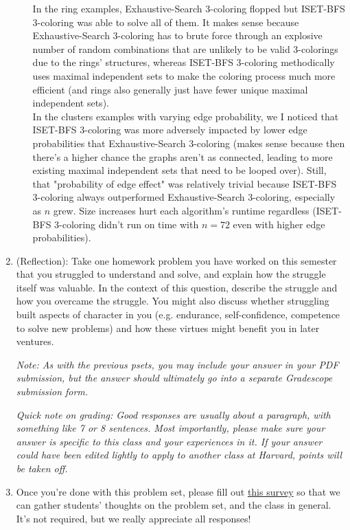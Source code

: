 \documentclass[11pt]{article}
\begin{document}
\begin{enumerate}
\begin{enumerate}
    In the ring examples, Exhaustive-Search 3-coloring flopped but ISET-BFS 3-coloring was able to solve all of them. It makes sense because Exhaustive-Search 3-coloring has to brute force through an explosive number of random combinations that are unlikely to be valid 3-colorings due to the rings' structures, whereas ISET-BFS 3-coloring methodically uses maximal independent sets to make the coloring process much more efficient (and rings also generally just have fewer unique maximal independent sets). \\

    In the clusters examples with varying edge probability, we I noticed that ISET-BFS 3-coloring was more adversely impacted by lower edge probabilities that Exhaustive-Search 3-coloring (makes sense because then there's a higher chance the graphs aren't as connected, leading to more existing maximal independent sets that need to be looped over). Still, that "probability of edge effect" was relatively trivial because ISET-BFS 3-coloring always outperformed Exhaustive-Search 3-coloring, especially as $n$ grew. Size increases hurt each algorithm's runtime regardless (ISET-BFS 3-coloring didn't run on time with $n = 72$ even with higher edge probabilities).
    
  \end{enumerate}
  
  

\item (Reflection): Take one homework problem you have worked on this semester that you struggled to understand and solve, and explain how the struggle itself was valuable.  In the context of this question, describe the struggle and how you overcame the struggle. You might also discuss whether struggling built aspects of character in you (e.g. endurance, self-confidence, competence to solve new problems) and how these virtues might benefit you in later ventures. 

 \textit{Note: As with the previous psets, you may include your answer in your PDF submission, but the answer should ultimately go into a separate Gradescope submission form.}

 \textit{Quick note on grading: Good responses are usually about a paragraph, with something like 7 or 8 sentences. Most importantly, please make sure your answer is specific to this class and your experiences in it. If your answer could have been edited lightly to apply to another class at Harvard, points will be taken off.}

\item Once you're done with this problem set, please fill out \href{https://forms.gle/pR1Mt4PmMhUfuW1G6}{this survey} so that we can gather students' thoughts on the problem set, and the class in general. It's not required, but we really appreciate all responses!
\end{enumerate}
\end{document}
